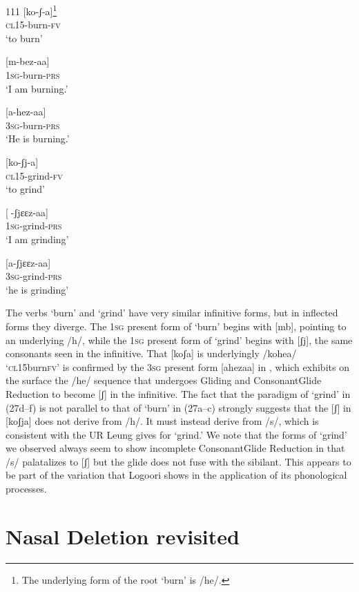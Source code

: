 \documentclass[output=paper]{langsci/langscibook}
\begin{document}
\begin{tabular}{111}
\ea\label{ex:glewwe:27}{}
  \ea\label{ex:glewwe:27a}
 [ko-ʃ{}-a]\footnote{The underlying form of the root ‘burn’ is /he/.} \\{}
\textsc{cl15}-burn-\textsc{fv}\\{}
\glt ‘to burn’

\ex\label{ex:glewwe:27b}{}
 [m-bez-aa]\\{}
\textsc{1sg}-burn-\textsc{prs}\\{}
\glt ‘I am burning.’


\ex\label{ex:glewwe:27c}{}
 [a-hez-aa]\\{}
\textsc{3sg}-burn-\textsc{prs}\\{}
\glt ‘He is burning.’


\ex\label{ex:glewwe:27d}{}
 [ko-ʃj-a]\\{}
\textsc{cl15}-grind-\textsc{fv}\\{}
\glt ‘to grind’


\ex\label{ex:glewwe:27e}{}
 [-ʃjɛɛz-aa]\\{}
\textsc{1sg}-grind-\textsc{prs}\\{}
\glt ‘I am grinding’


\ex\label{ex:glewwe:27f}{}
 [a-ʃjɛɛz-aa]\\{}
\textsc{3sg}-grind-\textsc{prs}\\{}
\glt ‘he is grinding’
\z
\z

The verbs ‘burn’ and ‘grind’ have very similar infinitive forms, but in inflected forms they diverge. The 1\textsc{sg} present form of ‘burn’ begins with [mb], pointing to an underlying /h/, while the 1\textsc{sg} present form of ‘grind’ begins with [ʃj], the same consonants seen in the infinitive. That [koʃa] is underlyingly /kohea/ ‘\textsc{cl}15burn\textsc{fv’} is confirmed by the 3\textsc{sg} present form [ahezaa] in , which exhibits on the surface the /he/ sequence that undergoes Gliding and ConsonantGlide Reduction to become [ʃ] in the infinitive. The fact that the paradigm of ‘grind’ in (27d–f) is not parallel to that of ‘burn’ in (27a–c) strongly suggests that the [ʃ] in [koʃja] does not derive from /h/. It must instead derive from /s/, which is consistent with the UR Leung gives for ‘grind.’ We note that the forms of ‘grind’ we observed always seem to show incomplete ConsonantGlide Reduction in that /s/ palatalizes to [ʃ] but the glide does not fuse with the sibilant. This appears to be part of the variation that Logoori shows in the application of its phonological processes.

\section{Nasal Deletion revisited}


\end{tabular}
\end{document}
